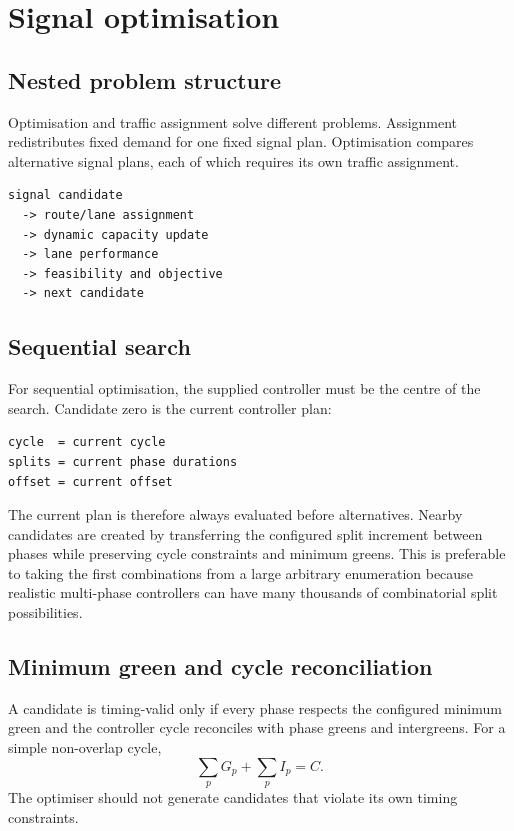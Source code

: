 \chapter{Signal optimisation}
\label{chap:optimisation}

\section{Nested problem structure}
Optimisation and traffic assignment solve different problems.  Assignment redistributes
fixed demand for one fixed signal plan.  Optimisation compares alternative signal
plans, each of which requires its own traffic assignment.

\begin{verbatim}
signal candidate
  -> route/lane assignment
  -> dynamic capacity update
  -> lane performance
  -> feasibility and objective
  -> next candidate
\end{verbatim}

\section{Sequential search}
For sequential optimisation, the supplied controller must be the centre of the search.
Candidate zero is the current controller plan:
\begin{verbatim}
cycle  = current cycle
splits = current phase durations
offset = current offset
\end{verbatim}
The current plan is therefore always evaluated before alternatives.  Nearby candidates
are created by transferring the configured split increment between phases while
preserving cycle constraints and minimum greens.  This is preferable to taking the
first combinations from a large arbitrary enumeration because realistic multi-phase
controllers can have many thousands of combinatorial split possibilities.

\section{Minimum green and cycle reconciliation}
A candidate is timing-valid only if every phase respects the configured minimum green
and the controller cycle reconciles with phase greens and intergreens.  For a simple
non-overlap cycle,
\begin{equation}
\sum_p G_p + \sum_p I_p = C.
\end{equation}
The optimiser should not generate candidates that violate its own timing constraints.

